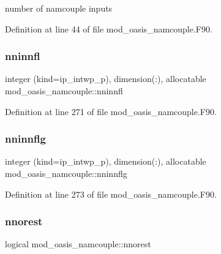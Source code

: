 number of namcouple inputs 



Definition at line 44 of file mod\+\_\+oasis\+\_\+namcouple.\+F90.

\mbox{\label{namespacemod__oasis__namcouple_a579387e570e26f2d6c6c2159824cf8a3}} 
\subsubsection{\texorpdfstring{nninnfl}{nninnfl}}
{\footnotesize\ttfamily integer (kind=ip\+\_\+intwp\+\_\+p), dimension(\+:), allocatable mod\+\_\+oasis\+\_\+namcouple\+::nninnfl\hspace{0.3cm}{\ttfamily [private]}}



Definition at line 271 of file mod\+\_\+oasis\+\_\+namcouple.\+F90.

\mbox{\label{namespacemod__oasis__namcouple_a6526a92cd5fa662f9da229806d062dc2}} 
\subsubsection{\texorpdfstring{nninnflg}{nninnflg}}
{\footnotesize\ttfamily integer (kind=ip\+\_\+intwp\+\_\+p), dimension(\+:), allocatable mod\+\_\+oasis\+\_\+namcouple\+::nninnflg\hspace{0.3cm}{\ttfamily [private]}}



Definition at line 273 of file mod\+\_\+oasis\+\_\+namcouple.\+F90.

\mbox{\label{namespacemod__oasis__namcouple_adb02545191d2ca9c1daff1a3ced2223f}} 
\subsubsection{\texorpdfstring{nnorest}{nnorest}}
{\footnotesize\ttfamily logical mod\+\_\+oasis\+\_\+namcouple\+::nnorest\hspace{0.3cm}{\ttfamily [private]}}



